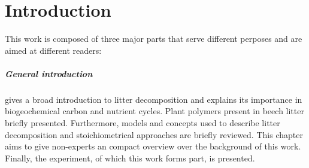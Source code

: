 \documentclass[a4paper,10pt]{book}
\begin{document}
% 
% 
% 
% 
% 
% 

\chapter*{Introduction}


This work is composed of three major parts that serve different perposes and are aimed at different readers: 

\paragraph{General introduction} gives a broad introduction to litter decomposition and explains its importance in biogeochemical carbon and nutrient cycles. Plant polymers present in beech litter briefly presented. Furthermore, models and concepts used to describe litter decomposition and stoichiometrical approaches are briefly reviewed. This chapter aims to give non-experts an compact overview over the background of this work. Finally, the experiment, of which this work forms part, is presented. 
\end{document}
